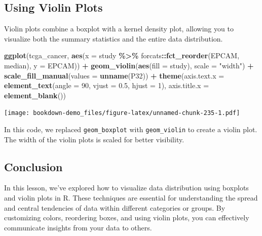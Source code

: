 \documentclass[
]{book}
\newenvironment{Shaded}{\begin{snugshade}}{\end{snugshade}}
\newcommand{\AttributeTok}[1]{\textcolor[rgb]{0.13,0.29,0.53}{#1}}
\newcommand{\DecValTok}[1]{\textcolor[rgb]{0.00,0.00,0.81}{#1}}
\newcommand{\FloatTok}[1]{\textcolor[rgb]{0.00,0.00,0.81}{#1}}
\newcommand{\FunctionTok}[1]{\textcolor[rgb]{0.13,0.29,0.53}{\textbf{#1}}}
\newcommand{\NormalTok}[1]{#1}
\newcommand{\SpecialCharTok}[1]{\textcolor[rgb]{0.81,0.36,0.00}{\textbf{#1}}}
\newcommand{\StringTok}[1]{\textcolor[rgb]{0.31,0.60,0.02}{#1}}
\begin{document}
\hypertarget{using-violin-plots}{%
\subsection{Using Violin Plots}\label{using-violin-plots}}

Violin plots combine a boxplot with a kernel density plot, allowing you to visualize both the summary statistics and the entire data distribution.

\begin{Shaded}
\begin{Highlighting}[]
\FunctionTok{ggplot}\NormalTok{(tcga\_cancer, }\FunctionTok{aes}\NormalTok{(}\AttributeTok{x =}\NormalTok{ study }\SpecialCharTok{\%\textgreater{}\%}
\NormalTok{                          forcats}\SpecialCharTok{::}\FunctionTok{fct\_reorder}\NormalTok{(EPCAM, median), }
                        \AttributeTok{y =}\NormalTok{ EPCAM)) }\SpecialCharTok{+}
  \FunctionTok{geom\_violin}\NormalTok{(}\FunctionTok{aes}\NormalTok{(}\AttributeTok{fill =}\NormalTok{ study), }\AttributeTok{scale =} \StringTok{"width"}\NormalTok{) }\SpecialCharTok{+}
  \FunctionTok{scale\_fill\_manual}\NormalTok{(}\AttributeTok{values =} \FunctionTok{unname}\NormalTok{(P32)) }\SpecialCharTok{+}
  \FunctionTok{theme}\NormalTok{(}\AttributeTok{axis.text.x =} \FunctionTok{element\_text}\NormalTok{(}\AttributeTok{angle =} \DecValTok{90}\NormalTok{, }\AttributeTok{vjust =} \FloatTok{0.5}\NormalTok{, }\AttributeTok{hjust =} \DecValTok{1}\NormalTok{),}
        \AttributeTok{axis.title.x =} \FunctionTok{element\_blank}\NormalTok{())}
\end{Highlighting}
\end{Shaded}

\texttt{[image: bookdown-demo\_files/figure-latex/unnamed-chunk-235-1.pdf]}

In this code, we replaced \texttt{geom\_boxplot} with \texttt{geom\_violin} to create a violin plot. The width of the violin plots is scaled for better visibility.

\hypertarget{conclusion-24}{%
\subsection{Conclusion}\label{conclusion-24}}

In this lesson, we've explored how to visualize data distribution using boxplots and violin plots in R. These techniques are essential for understanding the spread and central tendencies of data within different categories or groups. By customizing colors, reordering boxes, and using violin plots, you can effectively communicate insights from your data to others.
\end{document}

